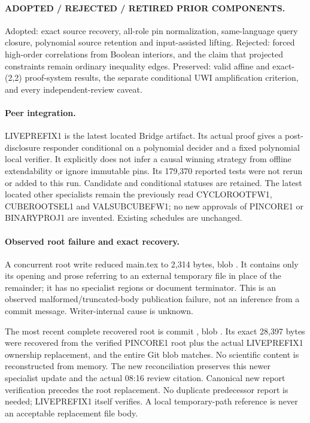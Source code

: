 \documentclass[11pt]{article}
\begin{document}
\paragraph{ADOPTED / REJECTED / RETIRED PRIOR COMPONENTS.}
Adopted: exact source recovery, all-role pin normalization, same-language
query closure, polynomial source retention and input-assisted lifting.
Rejected: forced high-order correlations from Boolean interiors, and the
claim that projected constraints remain ordinary inequality edges.
Preserved: valid affine and exact-(2,2) proof-system results, the separate
conditional UWI amplification criterion, and every independent-review caveat.

\paragraph{Peer integration.}
LIVEPREFIX1 is the latest located Bridge artifact. Its actual proof gives a
post-disclosure responder conditional on a polynomial decider and a fixed
polynomial local verifier. It explicitly does not infer a causal winning
strategy from offline extendability or ignore immutable pins. Its 179,370
reported tests were not rerun or added to this run. Candidate and conditional
statuses are retained. The latest located other specialists remain the
previously read CYCLOROOTFW1, CUBEROOTSEL1 and VALSUBCUBEFW1; no new approvals
of PINCORE1 or BINARYPROJ1 are invented. Existing schedules are unchanged.

\paragraph{Observed root failure and exact recovery.}
A concurrent root write reduced main.tex to 2,314 bytes, blob
. It contains only its opening
and prose referring to an external temporary file in place of the remainder;
it has no specialist regions or document terminator. This is an observed
malformed/truncated-body publication failure, not an inference from a commit
message. Writer-internal cause is unknown.

The most recent complete recovered root is commit
, blob
. Its exact 28,397 bytes were
recovered from the verified PINCORE1 root plus the actual LIVEPREFIX1 ownership
replacement, and the entire Git blob matches. No scientific content is
reconstructed from memory. The new reconciliation preserves this newer
specialist update and the actual 08:16 review citation. Canonical new report
verification precedes the root replacement. No duplicate predecessor report
is needed; LIVEPREFIX1 itself verifies. A local temporary-path reference is
never an acceptable replacement file body.
\end{document}
